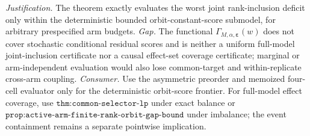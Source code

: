 \documentclass{article}
\begin{document}
\par\smallskip\noindent \textit{Justification.} The theorem exactly evaluates the worst joint rank-inclusion deficit only within the deterministic bounded orbit-constant-score submodel, for arbitrary prespecified arm budgets. \textit{Gap.} The functional \(\Gamma_{M,\alpha,\boldsymbol\varepsilon}(w)\) does not cover stochastic conditional residual scores and is neither a uniform full-model joint-inclusion certificate nor a causal effect-set coverage certificate; marginal or arm-independent evaluation would also lose common-target and within-replicate cross-arm coupling. \textit{Consumer.} Use the asymmetric preorder and memoized four-cell evaluator only for the deterministic orbit-score frontier. For full-model effect coverage, use \(\texttt{thm:common-selector-lp}\) under exact balance or \(\texttt{prop:active-arm-finite-rank-orbit-gap-bound}\) under imbalance; the event containment remains a separate pointwise implication.
\end{document}
